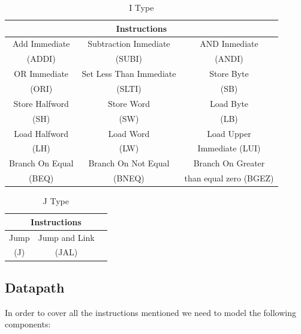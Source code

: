 \documentclass[conference]{IEEEtran}
\begin{document}
\begin{table}[htbp]
\caption{I Type} %
\begin{center}
\begin{tabular}{|c|c|c|}
\hline
\multicolumn{3}{|c|}{\textbf{Instructions}} \\
\hline
Add Immediate&Subtraction Inmediate & AND Inmediate \\
(ADDI) &(SUBI) & (ANDI) \\
\hline
OR Immediate&Set Less Than Immediate&  Store Byte \\
(ORI)&(SLTI)&(SB) \\
\hline
Store Halfword&Store Word&Load Byte \\
(SH)&(SW)&(LB)\\
\hline
Load Halfword&Load Word&Load Upper\\
(LH)&(LW)&Immediate (LUI)\\
\hline
Branch On Equal&Branch On Not Equal&Branch On Greater \\
(BEQ)&(BNEQ)&than equal zero (BGEZ)  \\
\hline
\end{tabular}
\label{tab_itype}
\end{center}
\end{table}

\begin{table}[htbp]
\caption{J Type} %
\begin{center}
\begin{tabular}{|c|c|c|}
\hline
\multicolumn{3}{|c|}{\textbf{Instructions}} \\
\hline
Jump&Jump and Link&\\
(J) &(JAL)&\\
\hline
\end{tabular}
\label{tab_itype}
\end{center}
\end{table}
\subsection{Datapath}
In order to cover all the instructions mentioned we need to model the following components:
\end{document}
